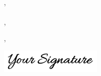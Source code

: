 \documentclass[12pt]{letter}
\begin{document}
  \PlaceHeader{\MasterColor}

  \begin{center}
    {
      \fontsize{28}{0}\selectfont\scshape \Name
    } \\[0.5cm]

    \faEnvelope\enspace \Email \hfill
    \faPhone\enspace \Phone \hfill
    \faMapMarker\enspace \Location

  \end{center}

  \vspace{0.5cm}

  \Date \\

  \vspace{-0.5cm}
  \Company \\
  \Street \\
  \City, \State\, \Zip \\

  \Object \\

  \Recipient, \\

  \setlength\parindent{24pt}
  

  \vfill

  \begin{flushleft}
    \Closer,

    \includegraphics[width=5cm]{figs/signature.png}

  \end{flushleft}
\end{document}
